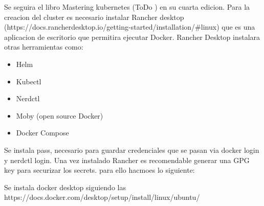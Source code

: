 \documentclass[../main.tex]{subfiles}
\begin{document}
Se seguira el libro Mastering kubernetes (ToDo ) en su cuarta edicion. Para la creacion del cluster es necesario instalar Rancher desktop (https://docs.rancherdesktop.io/getting-started/installation/\#linux) que es una aplicacion de escritorio que permitira ejecutar Docker. Rancher Desktop instalara otras herramientas como: 

\begin{itemize}
	\item 	Helm
	\item 	Kubectl
	\item 	Nerdctl
	\item 	Moby (open source Docker)
	\item 	Docker Compose
\end{itemize}

Se instala pass, necesario para guardar credenciales que se pasan via docker login y nerdctl login.
Una vez instalado Rancher es recomendable generar una GPG key para securizar los secrets. para ello hacmoes lo siguiente:

Se instala docker desktop siguiendo las 
https://docs.docker.com/desktop/setup/install/linux/ubuntu/
\end{document}
